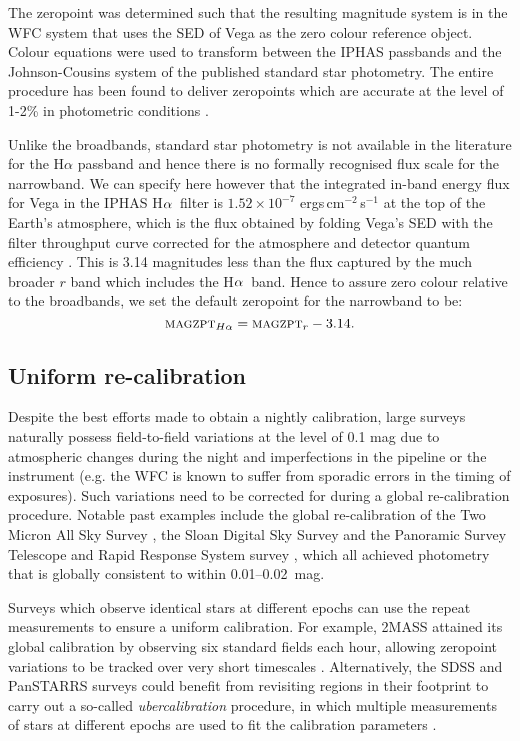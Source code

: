 \documentclass[useAMS,usenatbib]{mn2e}
\def\ha{\mbox{H$\rm \alpha$}}
\begin{document}
The zeropoint was determined such that the resulting magnitude system
is in the WFC system that uses the SED of Vega 
as the zero colour reference object. 
Colour equations were used to transform between the IPHAS passbands 
and the Johnson-Cousins system 
of the published standard star photometry.
The entire procedure has been found to deliver zeropoints which 
are accurate at the level of 1-2\% 
in photometric conditions \citep{Gonzalez-Solares2011}.

Unlike the broadbands, 
standard star photometry is not available in the literature 
for the H$\alpha$ passband
and hence there is no formally recognised flux scale 
for the narrowband.
We can specify here however 
that the integrated in-band energy flux for Vega 
in the IPHAS \ha\ filter 
is $1.52 \times 10^{-7}$ ergs\,cm$^{-2}$\,s$^{-1}$ 
at the top of the Earth's atmosphere,
which is the flux obtained by folding 
Vega's SED with the filter throughput curve 
corrected for the atmosphere and detector quantum efficiency
\citep[following the method explained by][]{Drew2005}.
This is 3.14 magnitudes less than the flux captured 
by the much broader $r$ band
which includes the \ha\ band.
Hence to assure zero colour relative to the broadbands,
we set the default zeropoint for the narrowband to be:
\begin{equation}
\textsc{magzpt}_{H\alpha} = \textsc{magzpt}_r - 3.14.
\label{eqn:zpha}
\end{equation}

\subsection{Uniform re-calibration}

Despite the best efforts made to obtain a nightly calibration,
large surveys naturally possess field-to-field variations
at the level of 0.1 mag
due to atmospheric changes during the night
and imperfections in the pipeline or the instrument
(e.g. the WFC is known to suffer from sporadic errors
in the timing of exposures).
Such variations need to be corrected for 
during a global re-calibration procedure.
Notable past examples include the global re-calibration 
of the Two Micron All Sky Survey \citep[2MASS;][]{Nikolaev2000},
the Sloan Digital Sky Survey \citep[SDSS;][]{Padmanabhan2008}
and the Panoramic Survey Telescope 
and Rapid Response System survey \citep[Pan-STARRS;][]{Schlafly2012},
which all achieved photometry 
that is globally consistent to within 0.01--0.02~mag.

Surveys which observe identical stars at different epochs
can use the repeat measurements to ensure a uniform calibration.
For example, 2MASS attained its global calibration
by observing six standard fields each hour, 
allowing zeropoint variations to be tracked 
over very short timescales \citep{Nikolaev2000}.
Alternatively, the SDSS and PanSTARRS surveys could benefit
from revisiting regions in their footprint to 
carry out a so-called \emph{ubercalibration} procedure,
in which multiple measurements of stars at different epochs
are used to fit the calibration parameters
\citep[e.g.][]{Padmanabhan2008,Schlafly2012}.
\end{document}
